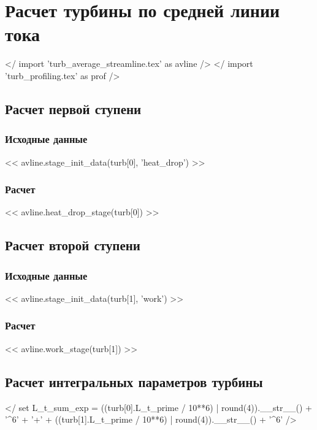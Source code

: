 \documentclass[a4paper,10pt]{article}
\begin{document}
    \section{Расчет турбины по средней линии тока}

    </ import 'turb_average_streamline.tex' as avline />
    </ import 'turb_profiling.tex' as prof />

    \subsection{Расчет первой ступени}

    \subsubsection{Исходные данные}

    << avline.stage_init_data(turb[0], 'heat_drop') >>

    \subsubsection{Расчет}

    << avline.heat_drop_stage(turb[0]) >>

    \subsection{Расчет второй ступени}

    \subsubsection{Исходные данные}

    << avline.stage_init_data(turb[1], 'work') >>

    \subsubsection{Расчет}

    << avline.work_stage(turb[1]) >>

    \subsection{Расчет интегральных параметров турбины}

    </ set L_t_sum_exp = ((turb[0].L_t_prime / 10**6) | round(4)).__str__() + '^6' + '+' +
        ((turb[1].L_t_prime / 10**6) | round(4)).__str__() + '^6' />
\end{document}
